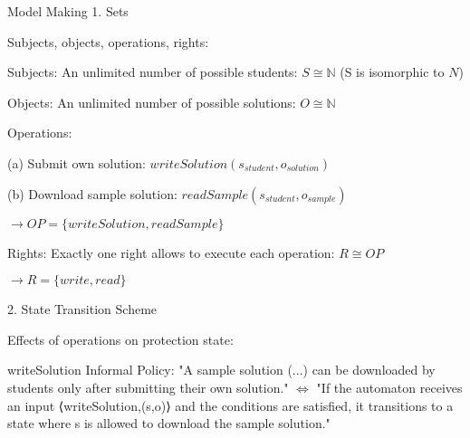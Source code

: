 \documentclass[a4paper]{article}
\begin{document}
\begin{multicols}{3}
    Model Making
    1. Sets
    \begin{itemize*}
        \item Subjects, objects, operations, rights:
              \begin{itemize*}
                  \item Subjects: An unlimited number of possible students: $S\cong\mathbb{N}$ (S is isomorphic to $N$)
                  \item Objects: An unlimited number of possible solutions: $O\cong\mathbb{N}$
                  \item Operations:
                        \begin{itemize*}
                            \item (a) Submit own solution: $writeSolution(s_{student},o_{solution})$
                            \item (b) Download sample solution: $readSample(s_{student},o_{sample})$
                            \item $\rightarrow OP=\{writeSolution, readSample\}$
                        \end{itemize*}
                  \item Rights: Exactly one right allows to execute each operation: $R\cong OP$
                        \begin{itemize*}
                            \item $\rightarrow R=\{write, read\}$
                        \end{itemize*}
              \end{itemize*}
    \end{itemize*}
    2. State Transition Scheme
    \begin{itemize*}
        \item Effects of operations on protection state:
              \begin{itemize*}
                  \item writeSolution
                        Informal Policy: "A sample solution (...) can be downloaded by students only after submitting their own solution." $\Leftrightarrow$  "If the automaton receives an input ⟨writeSolution,(s,o)⟩ and the conditions are satisfied, it transitions to a state where s is allowed to download the sample solution."
              \end{itemize*}
    \end{itemize*}


\end{multicols}
\end{document}
